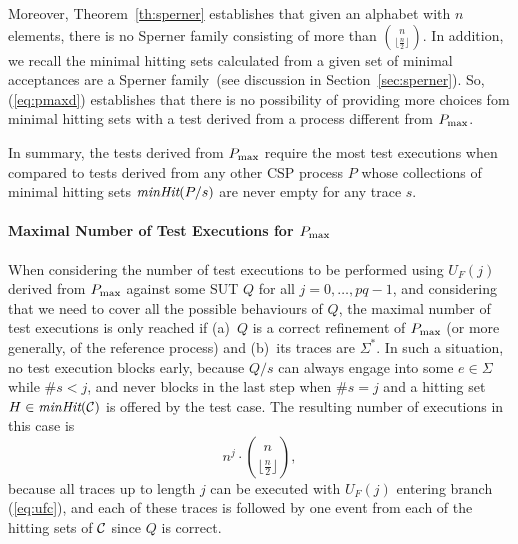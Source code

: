 Moreover, Theorem~\ref{th:sperner} establishes that given an alphabet with
$n$ elements, there is no Sperner family consisting of more than
$\binom{n}{\lfloor\frac{n}{2}\rfloor}$. In addition, we recall the minimal
hitting sets calculated from a given set of minimal acceptances are a Sperner
family~(see discussion in Section~\ref{sec:sperner}). So, (\ref{eq:pmaxd})
establishes that there is no possibility of providing more choices fom
minimal hitting sets with a test derived from a process different from
$P_\text{max}$.

In summary, the tests derived from $P_\text{max}$ require the most test executions
when compared to tests derived from any other CSP process $P$ whose
collections of minimal hitting sets $\text{\it minHit}(P/s)$ are never empty for any
trace $s$.

\paragraph{Maximal Number of Test Executions for $P_\text{max}$}
When considering the number of test executions to be performed using $U_F(j)$
derived from $P_\text{max}$ against some SUT $Q$ for all $j = 0,\dots,pq-1$, and
considering that we need to cover all the possible behaviours of $Q$, the
maximal number of test executions is only reached if (a)~$Q$ is a correct
refinement of $P_\text{max}$ (or more generally, of the reference process) and
(b)~its traces are $\Sigma^*$.
%
In such a situation, no test execution blocks early, because $Q/s$ can always
engage into some $e\in\Sigma$  while $\#s<j$, and never blocks in the last
step when $\#s = j$ and a hitting set $H\in\text{\it minHit}({\cal C})$ is offered by
the test case. The resulting number of executions in this case is
%
\begin{equation}
\label{eq:maxexec}
n^{j}\cdot \binom{n}{\lfloor\frac{n}{2}\rfloor},
\end{equation}
%
because all traces up to length $j$ can be executed with $U_F(j)$
entering branch (\ref{eq:ufc}), and each of these traces is followed by one
event from each of the hitting sets of ${\cal C}$ since $Q$ is correct.  %

